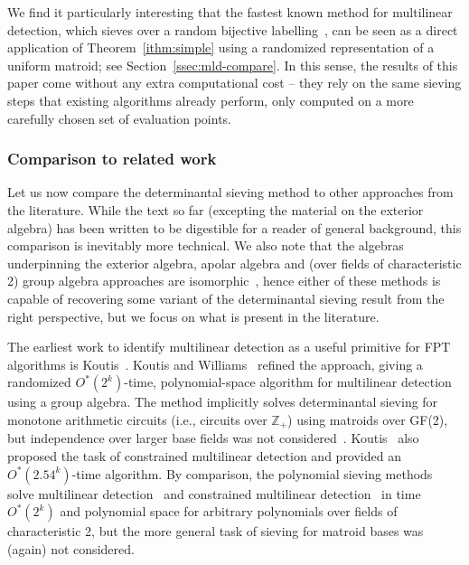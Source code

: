 \documentclass{theoretics}
\begin{document}
We find it particularly interesting that the fastest known
method for multilinear detection, which sieves over a random bijective
labelling~\cite{Bjorklund14detsum,BjorklundHKK17narrow}, 
can be seen as a direct application of Theorem~\ref{ithm:simple}
using a randomized representation of a uniform matroid;
see Section~\ref{ssec:mld-compare}.
In this sense, the results of this paper come without any extra computational cost -- 
they rely on the same sieving steps that existing algorithms already perform, only computed on a more carefully chosen set of evaluation points.

\subsubsection{Comparison to related work} \label{ssec:related}
Let us now compare the determinantal sieving method to other
approaches from the literature. While the text so far (excepting the
material on the exterior algebra) has been written to be 
digestible for a reader of general background,
this comparison is inevitably more technical.
We also note that the algebras underpinning the
exterior algebra, apolar algebra and (over fields of characteristic 2)
group algebra approaches are isomorphic~\cite{Brand22note,BrandDH18},
hence either of these methods is capable of recovering some variant 
of the determinantal sieving result from the right perspective, but we focus on what is
present in the literature. 

The earliest work to identify multilinear detection as a useful
primitive for FPT algorithms is Koutis~\cite{Koutis05IPL}. Koutis and
Williams~\cite{Koutis08ICALP,KoutisW16limits,Williams09IPL} refined
the approach, giving a randomized $O^*(2^k)$-time, polynomial-space
algorithm for multilinear detection using a group algebra.
The method implicitly solves determinantal sieving for monotone
arithmetic circuits (i.e., circuits over $\mathbb{Z}_+$) using
matroids over GF(2), but independence over larger base fields was not considered~\cite{KoutisW16limits}.
Koutis~\cite{Koutis12motif} also proposed the task of constrained
multilinear detection and provided an $O^*(2.54^k)$-time algorithm.
By comparison, the polynomial sieving methods solve multilinear
detection~\cite{Bjorklund14detsum,BjorklundHKK17narrow}
and constrained multilinear detection~\cite{BjorklundKK16}
in time $O^*(2^k)$ and polynomial space
for arbitrary polynomials over fields of characteristic 2,
but the more general task of sieving for matroid bases was (again) not considered.  
\end{document}
